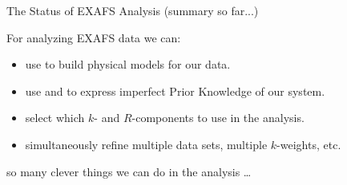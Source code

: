 \begin{slide}{The Status of EXAFS Analysis (summary so far...)}
    
   For analyzing EXAFS data we can:
    
    \begin{itemize}
    \item use {} to build physical models for our data.
      
    \item use {} and {} to
      express imperfect Prior Knowledge of our system.
      
    \item select which $k$- and $R$-components to use in the analysis.

    \item simultaneously refine multiple data sets, multiple $k$-weights,
      etc. 

    \end{itemize}

    so many clever things we can do in the analysis \ldots

\vspace{1mm}

\vfill
\end{slide} 

